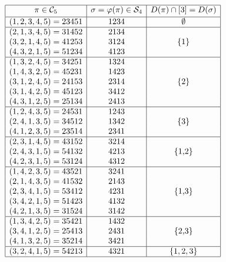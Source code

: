 \documentclass[11pt]{amsart}
\renewcommand\S{\mathcal S}
\newcommand\C{\mathcal C}
\newcommand\bij{\varphi}
\begin{document}
\begin{table}[htb]
$$\begin{array}{|c|c|c|c|c|c|c|}
\hline
\pi\in\C_5 & \sigma=\bij(\pi)\in\S_4 &  D(\pi)\cap[3]=D(\sigma) \\[2pt] \hline
(1,2,3,4,5) = 23451  & 1 2 3 4     & \emptyset \\ \hline
(2,1,3,4,5) = 31452  & 2 1 3 4     & \multirow{3}{*}{\{1\}}  \\
(3,2,1,4,5) = 41253  & 3 1 2 4     &   \\
(4,3,2,1,5) = 51234  & 4 1 2 3     &   \\ \hline
(1,3,2,4,5) = 34251  & 1 3 2 4     & \multirow{5}{*}{\{2\}}  \\
(1,4,3,2,5) = 45231  & 1 4 2 3     &  \\
(3,1,2,4,5) = 24153  & 2 3 1 4     &  \\
(3,1,4,2,5) = 45123  & 3 4 1 2     &  \\
(4,3,1,2,5) = 25134  & 2 4 1 3     &  \\ \hline
(1,2,4,3,5) = 24531  & 1 2 4 3     & \multirow{3}{*}{\{3\}}  \\
(2,4,1,3,5) = 34512  & 1 3 4 2     &  \\
(4,1,2,3,5) = 23514  & 2 3 4 1     &  \\ \hline
(2,3,1,4,5) = 43152  & 3 2 1 4     & \multirow{3}{*}{\{1,2\}}\\
(2,4,3,1,5) = 54132  & 4 2 1 3     & \\
(4,2,3,1,5) = 53124  & 4 3 1 2     & \\ \hline
(1,4,2,3,5) = 43521  & 3 2 4 1     & \multirow{5}{*}{\{1,3\}}\\
(2,1,4,3,5) = 41532  & 2 1 4 3     & \\
(2,3,4,1,5) = 53412  & 4 2 3 1     & \\
(3,4,2,1,5) = 51423  & 4 1 3 2     &  \\
(4,2,1,3,5) = 31524  & 3 1 4 2     &  \\ \hline
(1,3,4,2,5) = 35421  & 1 4 3 2     &  \multirow{3}{*}{\{2,3\}}\\
(3,4,1,2,5) = 25413  & 2 4 3 1     &   \\
(4,1,3,2,5) = 35214  & 3 4 2 1     &  \\ \hline
(3,2,4,1,5) = 54213  & 4 3 2 1     & \{1,2,3\}\\
\hline
\end{array}$$
\caption{\label{tab:n4} The images by $\bij$ of all elements in $\C_5$.}
\end{table}
\end{document}

